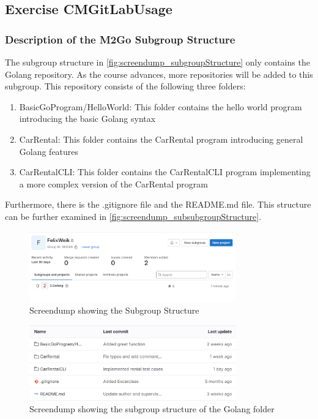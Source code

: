 \label{sec:exercise_cm_gitlab_usage}

\subsection{Exercise CMGitLabUsage}

\subsubsection*{Description of the M2Go Subgroup Structure}
The subgroup structure in \autoref{fig:screendump_subgroupStructure} only contains the Golang repository.
As the course advances, more repositories will be added to this subgroup.
This repository consists of the following three folders:
\begin{enumerate}
    \item BasicGoProgram/HelloWorld: This folder contains the hello world program introducing the basic Golang syntax
    \item CarRental: This folder contains the CarRental program introducing general Golang features
    \item CarRentalCLI: This folder contains the CarRentalCLI program implementing a more complex version of the CarRental program
\end{enumerate}
Furthermore, there is the .gitignore file and the README.md file.
This structure can be further examined in \autoref{fig:screendump_subsubgroupStructure}.

\begin{figure}[h]
    \centering
    \includegraphics[width=0.8\textwidth]{figures/goLang/golang_personalSubgroupStructure.png}
    \caption{Screendump showing the Subgroup Structure}
    \label{fig:screendump_subgroupStructure}
\end{figure}

\begin{figure}
    \centering
    \includegraphics[width=0.8\textwidth]{figures/goLang/golang_personalSubsubgroupStructure.png}
    \caption{Screendump showing the subgroup structure of the Golang folder}
    \label{fig:screendump_subsubgroupStructure}
\end{figure}

